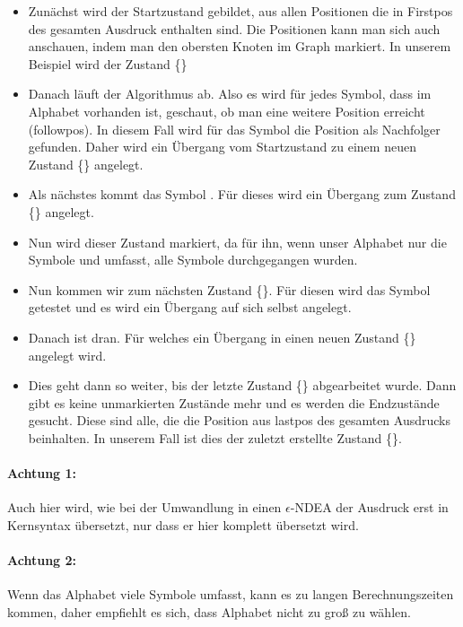 \begin{itemize}
  \item Zunächst wird der Startzustand gebildet, aus allen Positionen die in Firstpos des gesamten Ausdruck enthalten sind. Die Positionen kann man sich auch anschauen, indem man den obersten Knoten im Graph markiert. In unserem Beispiel wird der Zustand \{\}
  \item Danach läuft der Algorithmus ab. Also es wird für jedes Symbol, dass im Alphabet vorhanden ist, geschaut, ob man eine weitere Position erreicht (followpos). In diesem Fall wird für das Symbol  die Position  als Nachfolger gefunden. Daher wird ein Übergang  vom Startzustand zu einem neuen Zustand \{\} angelegt.
  \item Als nächstes kommt das Symbol . Für dieses wird ein Übergang zum Zustand \{\} angelegt.
  \item Nun wird dieser Zustand markiert, da für ihn, wenn unser Alphabet nur die Symbole  und  umfasst, alle Symbole durchgegangen wurden.
  \item Nun kommen wir zum nächsten Zustand \{\}. Für diesen wird das Symbol  getestet und es wird ein Übergang auf sich selbst angelegt.
  \item Danach ist  dran. Für welches ein Übergang in einen neuen Zustand \{\} angelegt wird.
  \item Dies geht dann so weiter, bis der letzte Zustand \{\} abgearbeitet wurde. Dann gibt es keine unmarkierten Zustände mehr und es werden die Endzustände gesucht. Diese sind alle, die die Position aus lastpos des gesamten Ausdrucks beinhalten. In unserem Fall ist dies der zuletzt erstellte Zustand \{\}.
\end{itemize}

\paragraph*{Achtung 1:} Auch hier wird, wie bei der Umwandlung in einen $\epsilon$-NDEA der Ausdruck erst in Kernsyntax übersetzt, nur dass er hier komplett übersetzt wird.

\paragraph*{Achtung 2:} Wenn das Alphabet viele Symbole umfasst, kann es zu langen Berechnungszeiten kommen, daher empfiehlt es sich, dass Alphabet nicht zu groß zu wählen.

